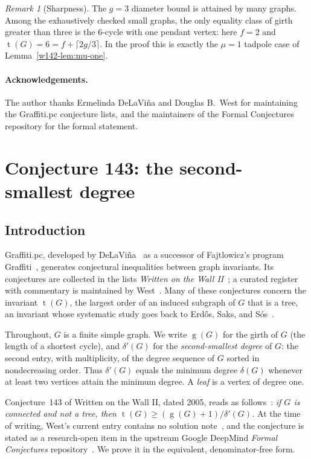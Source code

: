 \documentclass[11pt]{article}
\numberwithin{equation}{section}
\theoremstyle{remark}
\newtheorem{remark}[theorem]{Remark}
\newcommand{\tr}{\operatorname{t}}
\newcommand{\gr}{\operatorname{g}}
\newcommand{\dd}{\delta'}
\begin{document}
\begin{remark}[Sharpness]
The $g=3$ diameter bound is attained by many graphs.  Among the exhaustively
checked small graphs, the only equality class of girth greater than three is
the $6$-cycle with one pendant vertex: here $f=2$ and
$\tr(G)=6=f+\lceil2g/3\rceil$.  In the proof this is exactly the
$\mu=1$ tadpole case of Lemma~\ref{w142-lem:mu-one}.
\end{remark}

\paragraph{Acknowledgements.}
The author thanks Ermelinda DeLaVi\~na and Douglas B.\ West for maintaining
the Graffiti.pc conjecture lists, and the maintainers of the Formal
Conjectures repository for the formal statement.

\section{Conjecture 143: the second-smallest degree}
\subsection{Introduction}

Graffiti.pc, developed by DeLaVi\~na~\cite{DeL01,DeLhistory} as a successor of
Fajtlowicz's program Graffiti~\cite{Faj88}, generates conjectural inequalities
between graph invariants.  Its conjectures are collected in the lists
\emph{Written on the Wall II}~\cite{WOWII}; a curated register with commentary
is maintained by West~\cite{WestReg}.  Many of these conjectures concern the
invariant $\tr(G)$, the largest order of an induced subgraph of $G$ that is a
tree, an invariant whose systematic study goes back to Erd\H{o}s, Saks, and
S\'os~\cite{ESS86}.

Throughout, $G$ is a finite simple graph.  We write $\gr(G)$ for the girth of
$G$ (the length of a shortest cycle), and $\dd(G)$ for the \emph{second-smallest
degree} of $G$: the second entry, with multiplicity, of the degree sequence of
$G$ sorted in nondecreasing order.  Thus $\dd(G)$ equals the minimum degree
$\delta(G)$ whenever at least two vertices attain the minimum degree.  A
\emph{leaf} is a vertex of degree one.

Conjecture~143 of Written on the Wall II, dated 2005, reads as
follows~\cite{WestReg}: \emph{if $G$ is connected and not a tree, then
$\tr(G)\ge(\gr(G)+1)/\dd(G)$.}  At the time of writing, West's current
entry contains no solution note~\cite{WestReg}, and the conjecture is stated
as a research-open item in the upstream Google DeepMind \emph{Formal
Conjectures} repository~\cite{FC,FC143}.  We prove it in the equivalent,
denominator-free form.
\end{document}
